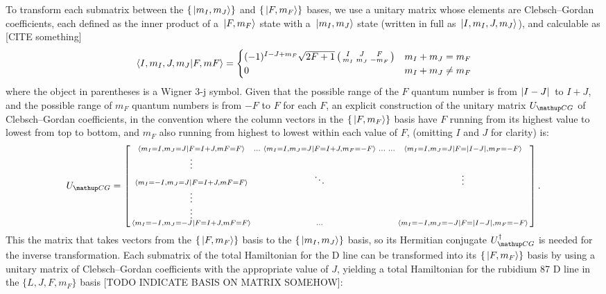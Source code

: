 To transform each submatrix between the $\{\ket{m_I, m_J}\}$ and $\{\ket{F, m_F}\}$ bases, we use a unitary matrix whose elements are Clebsch--Gordan coefficients, each defined as the inner product of a $\ket{F, m_F}$ state with a $\ket{m_I, m_J}$ state (written in full as $\ket{I, m_I, J, m_J}$), and calculable as [CITE something]
\begin{align}
\braket{I, m_I, J, m_J}{F, mF} = \begin{cases}
(-1)^{I - J + m_F}\sqrt{2F + 1}
\left(\begin{smallmatrix}
I & J & F\\
m_I & m_J & -m_F\\
\end{smallmatrix}\right) & m_I + m_J = m_F\\
0 & m_I + m_J \neq m_F
\end{cases}
\end{align}
where the object in parentheses is a Wigner $3$-j symbol. Given that the possible range of the $F$ quantum number is from $\abs{I - J}$ to $I + J$, and the possible range of $m_F$ quantum numbers is from $-F$ to $F$ for each $F$, an explicit construction of the unitary matrix $U_\up{CG}$ of Clebsch--Gordan coefficients, in the convention where the column vectors in the $\{\ket{F, m_F}\}$ basis have $F$ running from its highest value to lowest from top to bottom, and $m_F$ also running from highest to lowest within each value of $F$, (omitting $I$ and $J$ for clarity) is:
\begin{align}
U_\up{CG} = \left[\begin{smallmatrix}
\braket{m_I=I, m_J=J}{F=I+J, mF=F} & \hdots &
\braket{m_I=I, m_J=J}{F=I+J, m_F=-F} & \hdots &\hdots &
\braket{m_I=I, m_J=J}{F=\abs{I - J}, m_F=-F}\\
\vdots\\
\braket{m_I=-I, m_J=J}{F=I+J, mF=F} & & \ddots & & & \vdots\\
\vdots\\
\vdots\\
\braket{m_I=-I, m_J=-J}{F=I+J, mF=F} & & \hdots & & &
\braket{m_I=-I, m_J=-J}{F=\abs{I - J}, m_F=-F}\\
\end{smallmatrix}\right].
\end{align}
This the matrix that takes vectors from the $\{\ket{F, m_F}\}$ basis to the $\{\ket{m_I, m_J}\}$ basis, so its Hermitian conjugate $U^\dagger_\up{CG}$ is needed for the inverse transformation. Each submatrix of the total Hamiltonian for the D line can be transformed into its $\{\ket{F, m_F}\}$ basis by using a unitary matrix of Clebsch--Gordan coefficients with the appropriate value of $J$, yielding a total Hamiltonian for the rubidium 87 D line in the $\{L, J, F, m_F\}$ basis [TODO INDICATE BASIS ON MATRIX SOMEHOW]:
